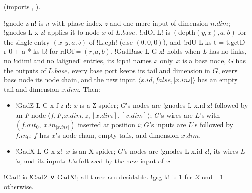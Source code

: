 { (imports , ).

\begin{definition}\label{def:boxes-gad}
\lbx!gnode z n! is $n$ with phase index $z$ and one more input of dimension $n.\mathit{dim}$; \lbx!gnodes L x z! applies it to node $x$ of $L.\mathit{base}$. \lbx!rdOf L! is $(\mathrm{depth}(y,x),a,b)$ for the single entry $(x,y,a,b)$ of \lbx!L.cph! (else $(0,0,0)$), and \lbx!rdU L ks t = t.getD r 0 + a * ks b! for $\mathrm{rdOf}=(r,a,b)$. \lbx!GadBase L G x! holds when $L$ has no links, no \lbx!cdim! and no \lbx!aligned! entries, its \lbx!cph! names $x$ only, $x$ is a base node, $G$ has the outputs of $L.\mathit{base}$, every base port keeps its tail and dimension in $G$, every base node its node chain, and the new input $\langle x.\mathit{id},\mathit{false},|x.\mathit{ins}|\rangle$ has an empty tail and dimension $x.\mathit{dim}$. Then:
\begin{itemize}
\item \lbx!GadZ L G x f z i!: $x$ is a Z spider; $G$'s nodes are \lbx!gnodes L x.id z! followed by an $F$ node $\langle f,F,x.\mathit{dim},z,[x.\mathit{dim}],[x.\mathit{dim}]\rangle$; $G$'s wires are $L$'s with $(f.\mathit{out}_0,\ x.\mathit{in}_{|x.\mathit{ins}|})$ inserted at position $i$; $G$'s inputs are $L$'s followed by $f.\mathit{in}_0$; $f$ has $x$'s node chain, empty tails, and dimension $x.\mathit{dim}$.
\item \lbx!GadX L G x z!: $x$ is an X spider; $G$'s nodes are \lbx!gnodes L x.id z!, its wires $L$'s, and its inputs $L$'s followed by the new input of $x$.
\end{itemize}
\lbx!Gad! is \lbx!GadZ ∨ GadX!; all three are decidable. \lbx!gsg k! is $1$ for $Z$ and $-1$ otherwise.
\end{definition}

}
